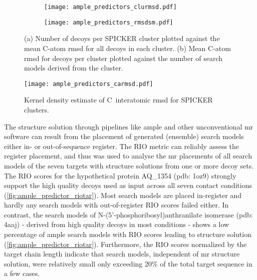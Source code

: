 \begin{figure}[H]
    \centering
    \begin{subfigure}[b]{\textwidth}
        \texttt{[image: ample\_predictors\_clurmsd.pdf]}
        \caption{}
        \label{fig:ample_predictor_clurmsd}
    \end{subfigure}
    \begin{subfigure}[b]{\textwidth}
        \texttt{[image: ample\_predictors\_rmsdsm.pdf]}
        \caption{}
        \label{fig:ample_predictor_rmsdsm}
    \end{subfigure}

    \caption{(a) Number of decoys per SPICKER cluster plotted against the mean C\textalpha-atom \gls{rmsd} for all decoys in each cluster. (b) Mean C\textalpha-atom \gls{rmsd} for decoys per cluster plotted against the number of search models derived from the cluster.}
\end{figure}

\begin{figure}[H]
    \centering
    \texttt{[image: ample\_predictors\_carmsd.pdf]}
    \caption{Kernel density estimate of C\textalpha\ interatomic \gls{rmsd} for SPICKER clusters.}
    \label{fig:ample_predictor_carmsd}
\end{figure}

The structure solution through pipelines like \gls{ample} and other unconventional \gls{mr} software \cite{Rodriguez2009-tk, Sammito2013-tt} can result from the placement of generated (ensemble) search models either in- or out-of-sequence register. The RIO metric \cite{Thomas2015-ag} can reliably assess the register placement, and thus was used to analyse the \gls{mr} placements of all search models of the seven targets with structure solutions from one or more decoy sets. The RIO scores for the hypothetical protein AQ\_1354 (\gls{pdb}: 1oz9) strongly support the high quality decoys used as input across all seven contact conditions (\cref{fig:ample_predictor_riotar}). Most search models are placed in-register and hardly any search models with out-of-register RIO scores failed either. In contrast, the search models of N-(5’-phosphoribosyl)anthranilate isomerase (\gls{pdb}: 4aaj) - derived from high quality decoys in most conditions - shows a low percentage of \gls{ample} search models with RIO scores leading to structure solution (\cref{fig:ample_predictor_riotar}). Furthermore, the RIO scores normalized by the target chain length indicate that search models, independent of \gls{mr} structure solution, were relatively small only exceeding 20\% of the total target sequence in a few cases. 

